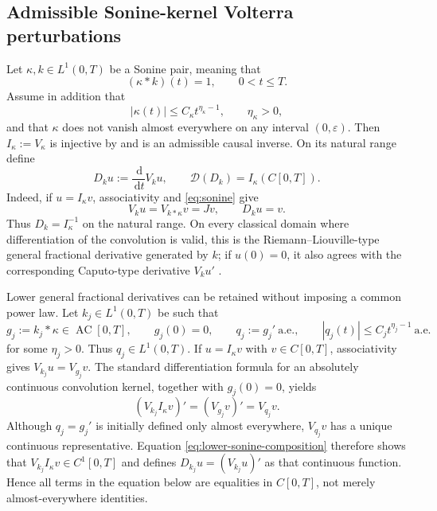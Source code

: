 \documentclass[11pt]{article}
\numberwithin{equation}{section}
\theoremstyle{definition}
\theoremstyle{remark}
\newcommand{\D}{\mathcal D}
\newcommand{\dd}{\,\mathrm d}
\newcommand{\AC}{\operatorname{AC}}
\begin{document}
\subsection{Admissible Sonine-kernel Volterra perturbations}

Let $\kappa,k\in L^1(0,T)$ be a Sonine pair, meaning that
\begin{equation}
(\kappa*k)(t)=1,
\qquad 0<t\le T.
\label{eq:sonine}
\end{equation}
Assume in addition that
\begin{equation}
|\kappa(t)|\le C_\kappa t^{\eta_\kappa-1},
\qquad \eta_\kappa>0,
\label{eq:kappa-bound}
\end{equation}
and that $\kappa$ does not vanish almost everywhere on any interval $(0,\varepsilon)$. Then $I_\kappa:=V_\kappa$ is injective by  and is an admissible causal inverse. On its natural range define
\begin{equation*}
D_ku:=\frac{\dd}{\dd t}V_ku,
\qquad \D(D_k)=I_\kappa(C[0,T]).
\end{equation*}
Indeed, if $u=I_\kappa v$, associativity and \eqref{eq:sonine} give
\begin{equation*}
V_ku=V_{k*\kappa}v=Jv,
\qquad D_ku=v.
\end{equation*}
Thus $D_k=I_\kappa^{-1}$ on the natural range. On every classical domain where differentiation of the convolution is valid, this is the Riemann--Liouville-type general fractional derivative generated by $k$; if $u(0)=0$, it also agrees with the corresponding Caputo-type derivative $V_ku'$ \cite{Luchko2022}.

Lower general fractional derivatives can be retained without imposing a common power law. Let $k_j\in L^1(0,T)$ be such that
\begin{equation}
g_j:=k_j*\kappa\in\AC[0,T],
\qquad g_j(0)=0,
\qquad q_j:=g_j'\ \text{a.e.},
\qquad |q_j(t)|\le C_jt^{\eta_j-1}\ \text{a.e.}
\label{eq:lower-sonine}
\end{equation}
for some $\eta_j>0$. Thus $q_j\in L^1(0,T)$. If $u=I_\kappa v$ with $v\in C[0,T]$, associativity gives $V_{k_j}u=V_{g_j}v$. The standard differentiation formula for an absolutely continuous convolution kernel, together with $g_j(0)=0$, yields
\begin{equation}
(V_{k_j}I_\kappa v)'=(V_{g_j}v)'=V_{q_j}v.
\label{eq:lower-sonine-composition}
\end{equation}
Although $q_j=g_j'$ is initially defined only almost everywhere, $V_{q_j}v$ has a unique continuous representative. Equation \eqref{eq:lower-sonine-composition} therefore shows that $V_{k_j}I_\kappa v\in C^1[0,T]$ and defines $D_{k_j}u=(V_{k_j}u)'$ as that continuous function. Hence all terms in the equation below are equalities in $C[0,T]$, not merely almost-everywhere identities.
\end{document}
